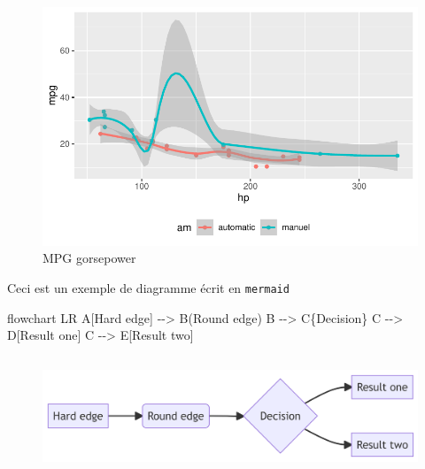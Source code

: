 \documentclass[
  12pt,
  a4paper,
]{scrbook}
\newenvironment{Shaded}{\begin{snugshade}}{\end{snugshade}}
\newcommand{\NormalTok}[1]{\textcolor[rgb]{0.40,0.48,0.51}{#1}}
\begin{document}
\begin{figure}[H]

{\centering \includegraphics{./03_resultats_files/figure-pdf/plot-mtcars2-1.pdf}

}

\caption{MPG gorsepower}

\end{figure}

Ceci est un exemple de diagramme écrit en \texttt{mermaid}

\begin{Shaded}
\begin{Highlighting}[numbers=left,,]

\NormalTok{flowchart LR}
\NormalTok{  A[Hard edge] {-}{-}\textgreater{} B(Round edge)}
\NormalTok{  B {-}{-}\textgreater{} C\{Decision\}}
\NormalTok{  C {-}{-}\textgreater{} D[Result one]}
\NormalTok{  C {-}{-}\textgreater{} E[Result two]}
\end{Highlighting}
\end{Shaded}

\begin{figure}[H]

{\centering \includegraphics[width=5.74in,height=1.4in]{./03_resultats_files/figure-latex/mermaid-figure-1.png}

}

\end{figure}
\end{document}
